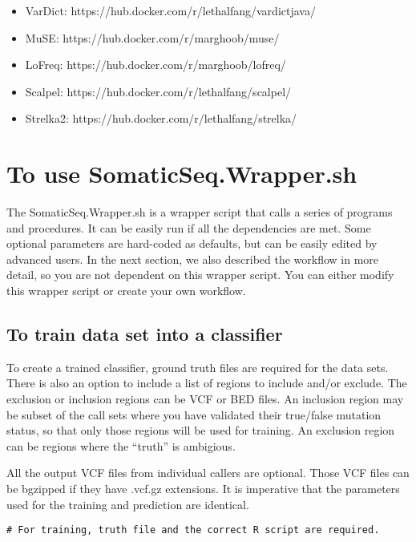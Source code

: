 \documentclass[10pt,letterpaper]{article}
\begin{document}
\begin{sloppypar}
\begin{itemize}
  \item VarDict: https://hub.docker.com/r/lethalfang/vardictjava/

  \item MuSE: https://hub.docker.com/r/marghoob/muse/

  \item LoFreq: https://hub.docker.com/r/marghoob/lofreq/

  \item Scalpel: https://hub.docker.com/r/lethalfang/scalpel/

  \item Strelka2: https://hub.docker.com/r/lethalfang/strelka/

\end{itemize}


\section{To use SomaticSeq.Wrapper.sh}

The SomaticSeq.Wrapper.sh is a wrapper script that calls a series of programs and procedures. It can be easily run if all the dependencies are met. Some optional parameters are hard-coded as defaults, but can be easily edited by advanced users. In the next section, we also described the workflow in more detail, so you are not dependent on this wrapper script. You can either modify this wrapper script or create your own workflow. 


\subsection{To train data set into a classifier}

To create a trained classifier, ground truth files are required for the data sets. There is also an option to include a list of regions to include and/or exclude. The exclusion or inclusion regions can be VCF or BED files. An inclusion region may be subset of the call sets where you have validated their true/false mutation status, so that only those regions will be used for training. An exclusion region can be regions where the ``truth'' is ambigious. 

All the output VCF files from individual callers are optional. Those VCF files can be bgzipped if they have .vcf.gz extensions. It is imperative that the parameters used for the training and prediction are identical. 


\begin{lstlisting}
# For training, truth file and the correct R script are required.


\end{lstlisting}
\end{sloppypar}
\end{document}
